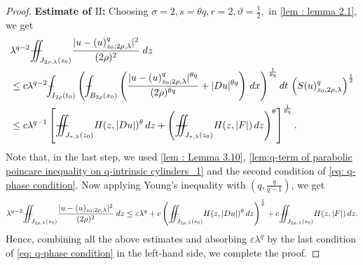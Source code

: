 \documentclass[11pt,oneside, english,reqno,twoside a4paper]{amsart}
\theoremstyle{definition}
\numberwithin{theorem}{section}
\numberwithin{equation}{section}
\def\Xint#1{\mathchoice
	{\XXint\displaystyle\textstyle{#1}}%
	{\XXint\textstyle\scriptstyle{#1}}%
	{\XXint\scriptstyle\scriptscriptstyle{#1}}%
	{\XXint\scriptscriptstyle\scriptscriptstyle{#1}}%
	\!\int}
\def\XXint#1#2#3{{\setbox0=\hbox{$#1{#2#3}{\int}$}
		\vcenter{\hbox{$#2#3$}}\kern-.50\wd0}}
\def\dashint{\Xint-}
\newcommand{\iintss}{{\int\hspace{-0.28cm}\int}}
\newcommand{ \miints }{{\iintss\hspace{-0.56cm} -\hspace{-0.15cm}-}}
\newcommand{\miint}[1]{{\miints_{\hspace{-0.13cm}#1}}}
\begin{document}
\begin{proof}
\noindent\textbf{Estimate of $\mathrm{II}$:} Choosing $\sigma =2, s=\theta q, r=2,\vartheta=\frac{1}{2},$ in \cref{lem : lemma 2.1}, we get
\begin{align*}
&\lambda^{q-2}\miint{J_{2\rho,\lambda}(z_0)}\frac{|u-(u)^q_{z_0;2\rho,\lambda}|^2}{(2\rho)^2}\; dz \\
&\leq c\lambda^{q-2} \dashint_{I_{2\rho}(t_0)}\left(\dashint_{B_{2\rho}(x_0)}\left(\frac{|u-(u)^q_{z_0;2\rho,\lambda}|^{\theta q}}{(2\rho)^{\theta q}}+|Du|^{\theta q}\right)\,dx\right)^{\frac{1}{\theta q}} dt \, \left(S(u)^q_{z_0, 2\rho, \lambda}\right)^{\frac{1}{2}}\\
&\leq c\lambda^{q-1} \left[\miint{J_{\tau,\lambda}(z_0)}H(z,|Du|)^{\theta}\, dz
         +\left(\miint{J_{\tau,\lambda}(z_0)}H(z,|F|) \, d z\right)^{\theta}\right]^{\frac{1}{\theta q}}.
\end{align*}
Note that, in the last step, we used \cref{lem : Lemma 3.10}, \cref{lem:q-term of parabolic poincare inequality on q-intrinsic cylinders_1} and the second condition of \eqref{eq: q-phase condition}. Now applying Young's inequality with $\left(q, \frac{q}{q-1}\right)$, we get
\begin{align*}
\lambda^{q-2}\miint{J_{2\rho,\lambda}(z_0)}\frac{|u-(u)_{z_0;2\rho,\lambda}|^2}{(2\rho)^2}\; dz \leq \varepsilon \lambda^q + c\left(\miint{J_{2\rho, \lambda}(z_0)}H(z, |Du|)^{\theta}\, dz \right)^{\frac{1}{\theta}}+ c\miint{J_{2\rho, \lambda}(z_0)}H(z, |F|)\, dz.
\end{align*}
Hence, combining all the above estimates and absorbing $\varepsilon \lambda^q$ by the last condition of \eqref{eq: q-phase condition} in the left-hand side, we complete the proof.
\end{proof}
\end{document}
